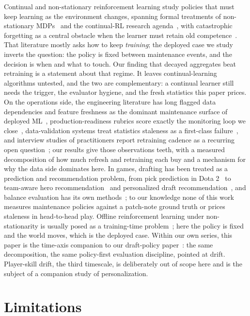 \documentclass[journal]{IEEEtran}
\begin{document}
Continual and non-stationary reinforcement learning study policies that
must keep learning as the environment changes, spanning formal
treatments of non-stationary MDPs~\cite{padakandla2021survey} and the
continual-RL research agenda~\cite{khetarpal2022continual}, with
catastrophic forgetting as a central obstacle when the learner must
retain old competence~\cite{kirkpatrick2017ewc}. That literature mostly
asks how to keep \emph{training}; the deployed case we study inverts the
question: the policy is fixed between maintenance events, and the
decision is when and what to touch. Our finding that decayed aggregates
beat retraining is a statement about that regime. It leaves
continual-learning algorithms untested, and the two are complementary: a
continual learner still needs the trigger, the evaluator hygiene, and
the fresh statistics this paper prices. On the operations side, the
engineering literature has long flagged data dependencies and feature
freshness as the dominant maintenance surface of deployed
ML~\cite{sculley2015debt}, production-readiness rubrics score exactly
the monitoring loop we close~\cite{breck2017mltest}, data-validation
systems treat statistics staleness as a first-class
failure~\cite{polyzotis2019data}, and interview studies of practitioners
report retraining cadence as a recurring open
question~\cite{shankar2022operationalizing}; our results give those
observations teeth, with a measured decomposition of how much refresh
and retraining each buy and a mechanism for why the data side dominates
here. In games, drafting has been treated as a prediction and
recommendation problem, from pick prediction in Dota
2~\cite{summerville2016draft} to team-aware hero
recommendation~\cite{chen2018art} and personalized draft
recommendation~\cite{draftrec}, and balance evaluation has its own
methods~\cite{jaffe2012balance}; to our knowledge none of this work
measures maintenance policies against a patch-note ground truth or
prices staleness in head-to-head play. Offline reinforcement learning
under non-stationarity is usually posed as a training-time
problem~\cite{levine2020offline}; here the policy is fixed and the world
moves, which is the deployed case. Within our own series, this paper is
the time-axis companion to our draft-policy paper~\cite{paper1}: the
same decomposition, the same policy-first evaluation discipline, pointed
at drift. Player-skill drift, the third timescale, is deliberately out of
scope here and is the subject of a companion study of personalization.

\section{Limitations}
\label{sec:limits}
\end{document}
